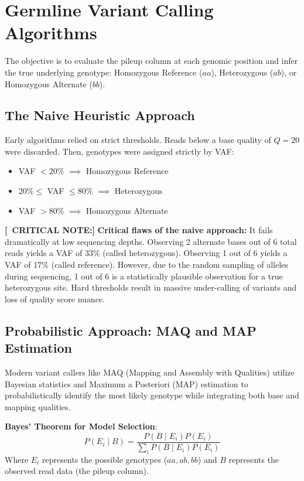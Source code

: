 \documentclass[11pt,a4paper]{article}
\newenvironment{important}{
    \vspace{1em}
    \begin{tcolorbox}[colback=blue!5!white, colframe=blue!75!black, boxrule=1pt, arc=4pt, left=10pt, right=10pt, top=10pt, bottom=10pt]
}{
    \end{tcolorbox}
    \vspace{1em}
}
\newcommand{\sta}{\textbf{[\textasteriskcentered\ CRITICAL NOTE:] }}
\begin{document}
\section{Germline Variant Calling Algorithms}
The objective is to evaluate the pileup column at each genomic position and infer the true underlying genotype: Homozygous Reference (\(aa\)), Heterozygous (\(ab\)), or Homozygous Alternate (\(bb\)).

\subsection{The Naive Heuristic Approach}
Early algorithms relied on strict thresholds. Reads below a base quality of \( Q = 20 \) were discarded. Then, genotypes were assigned strictly by VAF:
\begin{itemize}
    \item VAF $< 20\%$ \(\implies\) Homozygous Reference
    \item $20\% \leq$ VAF $\leq 80\%$ \(\implies\) Heterozygous
    \item VAF $> 80\%$ \(\implies\) Homozygous Alternate
\end{itemize}

\sta \textbf{Critical flaws of the naive approach:} It fails dramatically at low sequencing depths. Observing 2 alternate bases out of 6 total reads yields a VAF of 33\% (called heterozygous). Observing 1 out of 6 yields a VAF of 17\% (called reference). However, due to the random sampling of alleles during sequencing, 1 out of 6 is a statistically plausible observation for a true heterozygous site. Hard thresholds result in massive under-calling of variants and loss of quality score nuance.

\subsection{Probabilistic Approach: MAQ and MAP Estimation}
Modern variant callers like MAQ (Mapping and Assembly with Qualities) utilize Bayesian statistics and Maximum a Posteriori (MAP) estimation to probabilistically identify the most likely genotype while integrating both base and mapping qualities.

\begin{important}
  \textbf{Bayes' Theorem for Model Selection}:
  \[ P(E_i \mid B) = \frac{P(B \mid E_i) P(E_i)}{\sum_i P(B \mid E_i) P(E_i)} \]
  Where \( E_i \) represents the possible genotypes (\(aa, ab, bb\)) and \( B \) represents the observed read data (the pileup column).
\end{important}
\end{document}
